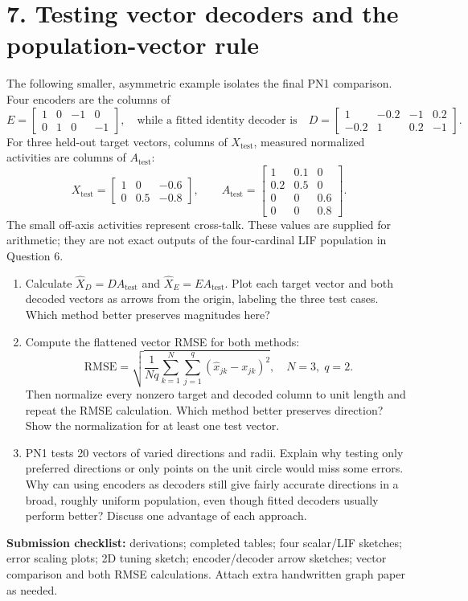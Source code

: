 \documentclass[11pt,letterpaper]{article}
\begin{document}
\section*{7. Testing vector decoders and the population-vector rule}
The following smaller, asymmetric example isolates the final PN1 comparison. Four encoders are the columns of
\[
E=\begin{bmatrix}1&0&-1&0\\0&1&0&-1\end{bmatrix},
\quad\text{while a fitted identity decoder is}\quad
D=\begin{bmatrix}1&-0.2&-1&0.2\\-0.2&1&0.2&-1\end{bmatrix}.
\]
For three held-out target vectors, columns of \(X_{\mathrm{test}}\), measured normalized activities are columns of \(A_{\mathrm{test}}\):
\[
X_{\mathrm{test}}=\begin{bmatrix}1&0&-0.6\\0&0.5&-0.8\end{bmatrix},\qquad
A_{\mathrm{test}}=\begin{bmatrix}1&0.1&0\\0.2&0.5&0\\0&0&0.6\\0&0&0.8\end{bmatrix}.
\]
The small off-axis activities represent cross-talk. These values are supplied for arithmetic; they are not exact outputs of the four-cardinal LIF population in Question 6.
\begin{enumerate}[label=\textbf{7\alph*.}]
\item Calculate \(\hat X_D=DA_{\mathrm{test}}\) and \(\hat X_E=EA_{\mathrm{test}}\). Plot each target vector and both decoded vectors as arrows from the origin, labeling the three test cases. Which method better preserves magnitudes here?
\item Compute the flattened vector RMSE for both methods:
\[
\mathrm{RMSE}=\sqrt{\frac{1}{Nq}\sum_{k=1}^{N}\sum_{j=1}^{q}(\hat x_{jk}-x_{jk})^2},\quad N=3,\;q=2.
\]
Then normalize every nonzero target and decoded column to unit length and repeat the RMSE calculation. Which method better preserves direction? Show the normalization for at least one test vector.
\item PN1 tests 20 vectors of varied directions and radii. Explain why testing only preferred directions or only points on the unit circle would miss some errors. Why can using encoders as decoders still give fairly accurate directions in a broad, roughly uniform population, even though fitted decoders usually perform better? Discuss one advantage of each approach.
\end{enumerate}

\vfill
\noindent\textbf{Submission checklist:} derivations; completed tables; four scalar/LIF sketches; error scaling plots; 2D tuning sketch; encoder/decoder arrow sketches; vector comparison and both RMSE calculations. Attach extra handwritten graph paper as needed.
\end{document}
